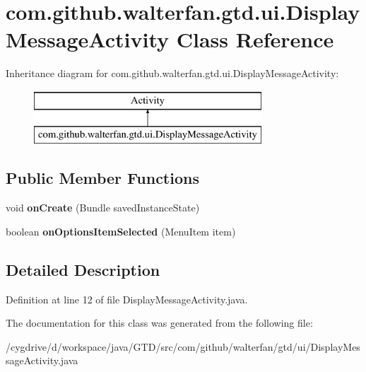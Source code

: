 \hypertarget{classcom_1_1github_1_1walterfan_1_1gtd_1_1ui_1_1DisplayMessageActivity}{\section{com.\-github.\-walterfan.\-gtd.\-ui.\-Display\-Message\-Activity Class Reference}
\label{classcom_1_1github_1_1walterfan_1_1gtd_1_1ui_1_1DisplayMessageActivity}
}
Inheritance diagram for com.\-github.\-walterfan.\-gtd.\-ui.\-Display\-Message\-Activity\-:\begin{figure}[H]
\begin{center}
\leavevmode
\includegraphics[height=2.000000cm]{classcom_1_1github_1_1walterfan_1_1gtd_1_1ui_1_1DisplayMessageActivity}
\end{center}
\end{figure}
\subsection*{Public Member Functions}
\begin{DoxyCompactItemize}
\item 
\hypertarget{classcom_1_1github_1_1walterfan_1_1gtd_1_1ui_1_1DisplayMessageActivity_a12f5742662e3bd6169473e735c47fd37}{void {\bfseries on\-Create} (Bundle saved\-Instance\-State)}\label{classcom_1_1github_1_1walterfan_1_1gtd_1_1ui_1_1DisplayMessageActivity_a12f5742662e3bd6169473e735c47fd37}

\item 
\hypertarget{classcom_1_1github_1_1walterfan_1_1gtd_1_1ui_1_1DisplayMessageActivity_a41ccaf42379e4210855749e6954dc5ed}{boolean {\bfseries on\-Options\-Item\-Selected} (Menu\-Item item)}\label{classcom_1_1github_1_1walterfan_1_1gtd_1_1ui_1_1DisplayMessageActivity_a41ccaf42379e4210855749e6954dc5ed}

\end{DoxyCompactItemize}


\subsection{Detailed Description}


Definition at line 12 of file Display\-Message\-Activity.\-java.



The documentation for this class was generated from the following file\-:\begin{DoxyCompactItemize}
\item 
/cygdrive/d/workspace/java/\-G\-T\-D/src/com/github/walterfan/gtd/ui/Display\-Message\-Activity.\-java\end{DoxyCompactItemize}
